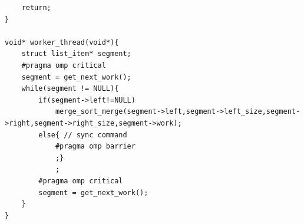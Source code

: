 \documentclass[12pt]{article}
\begin{document}
\begin{verbatim}
	return;
}

void* worker_thread(void*){
	struct list_item* segment;
	#pragma omp critical
	segment = get_next_work();
	while(segment != NULL){
		if(segment->left!=NULL)
			merge_sort_merge(segment->left,segment->left_size,segment->right,segment->right_size,segment->work);
		else{ // sync command
			#pragma omp barrier
			;}
			;
		#pragma omp critical
		segment = get_next_work();
	}
}
\end{verbatim}
\end{document}
